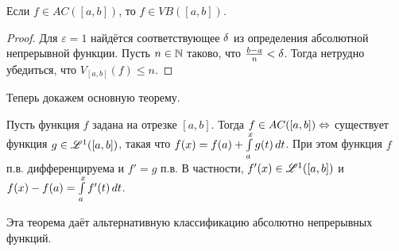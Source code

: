 \documentclass[10pt]{article}
\newcommand{\ve}{\varepsilon}
\begin{document}
\begin{stm}\label{ac=>vb}
Если $f\in AC([a,b])$, то $f\in VB([a,b])$.
\end{stm}

\begin{proof}
Для $\ve=1$ найдётся соответствующее $\delta$ из определения абсолютной
непрерывной функции. Пусть $n\in\mathbb{N}$ таково, что $\frac{b-a}n<\delta$.
Тогда нетрудно убедиться, что $V_{[a,b]}(f)\le n$.
\end{proof}

Теперь докажем основную теорему.

\begin{theorem}\label{abs_cont}
Пусть функция $f$ задана на отрезке $[a,b]$. Тогда $f\in
AC([a,b])\bw \Lra $ существует функция $g\in \mathscr{L}^1([a,b])$, такая
что $f(x)= f(a)\bw +\int\limits_a^xg(t)\,dt$. При этом функция $f$
п.в. дифференцируема и $f'=g$ п.в. В частности, $f'(x)\in
\mathscr{L}^1([a,b])$ и $f(x)-f(a)\bw =\int\limits_a^xf'(t)\,dt$.
\end{theorem}

\begin{note}
Эта теорема даёт альтернативную классификацию абсолютно непрерывных
функций.
\end{note}
\end{document}
